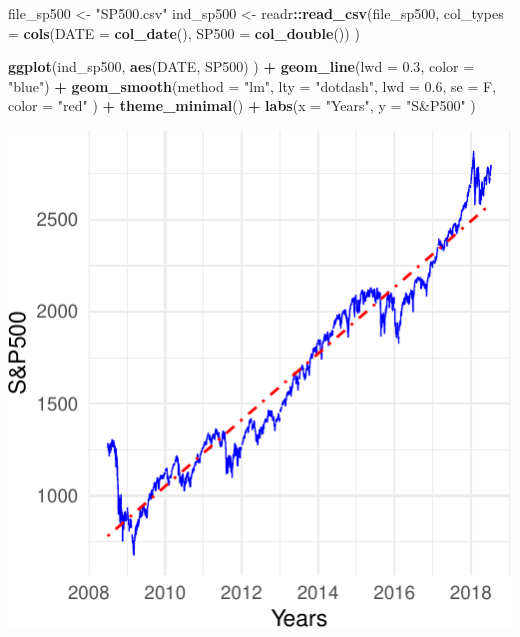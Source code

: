 \documentclass[11pt,]{article}
\newenvironment{Shaded}{\begin{snugshade}}{\end{snugshade}}
\newcommand{\KeywordTok}[1]{\textcolor[rgb]{0.13,0.29,0.53}{\textbf{#1}}}
\newcommand{\DataTypeTok}[1]{\textcolor[rgb]{0.13,0.29,0.53}{#1}}
\newcommand{\FloatTok}[1]{\textcolor[rgb]{0.00,0.00,0.81}{#1}}
\newcommand{\StringTok}[1]{\textcolor[rgb]{0.31,0.60,0.02}{#1}}
\newcommand{\OperatorTok}[1]{\textcolor[rgb]{0.81,0.36,0.00}{\textbf{#1}}}
\newcommand{\NormalTok}[1]{#1}
\begin{document}
\begin{Shaded}
\begin{Highlighting}[]
\NormalTok{file_sp500 <-}\StringTok{ "SP500.csv"}
\NormalTok{ind_sp500 <-}\StringTok{ }\NormalTok{readr}\OperatorTok{::}\KeywordTok{read_csv}\NormalTok{(file_sp500, }
                             \DataTypeTok{col_types =} \KeywordTok{cols}\NormalTok{(}\DataTypeTok{DATE =} \KeywordTok{col_date}\NormalTok{(), }
                                              \DataTypeTok{SP500 =} \KeywordTok{col_double}\NormalTok{())}
\NormalTok{                             )}

\KeywordTok{ggplot}\NormalTok{(ind_sp500, }
       \KeywordTok{aes}\NormalTok{(DATE, SP500)}
\NormalTok{       ) }\OperatorTok{+}
\StringTok{  }\KeywordTok{geom_line}\NormalTok{(}\DataTypeTok{lwd =} \FloatTok{0.3}\NormalTok{,}
            \DataTypeTok{color =} \StringTok{"blue"}\NormalTok{) }\OperatorTok{+}
\StringTok{  }\KeywordTok{geom_smooth}\NormalTok{(}\DataTypeTok{method =} \StringTok{"lm"}\NormalTok{,}
              \DataTypeTok{lty =} \StringTok{"dotdash"}\NormalTok{,}
              \DataTypeTok{lwd =} \FloatTok{0.6}\NormalTok{,}
              \DataTypeTok{se =}\NormalTok{ F,}
              \DataTypeTok{color =} \StringTok{"red"}
\NormalTok{              ) }\OperatorTok{+}
\StringTok{  }\KeywordTok{theme_minimal}\NormalTok{() }\OperatorTok{+}
\StringTok{  }\KeywordTok{labs}\NormalTok{(}\DataTypeTok{x =} \StringTok{"Years"}\NormalTok{,}
       \DataTypeTok{y =} \StringTok{"S&P500"}
\NormalTok{       )}
\end{Highlighting}
\end{Shaded}

\begin{center}\includegraphics{FMC_T4_PhD_Fin_Time_Series_files/figure-latex/SP500-1} \end{center}
\end{document}
